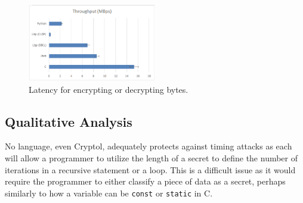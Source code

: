 \begin{figure}
\centerline{ 
\includegraphics[width = 0.5\textwidth]{throughput.PNG}}
\caption{Latency for encrypting or decrypting bytes.}
\label{fig:lan}
\end{figure}


\subsection{Qualitative Analysis}

No language, even Cryptol, adequately protects against timing attacks as each will allow a programmer to utilize the length of a secret 
to define the number of iterations in a recursive statement or a loop. This is a difficult issue as it would require the programmer to 
either classify a piece of data as a secret, perhaps similarly to how a variable can be \texttt{const} or \texttt{static} in C.
